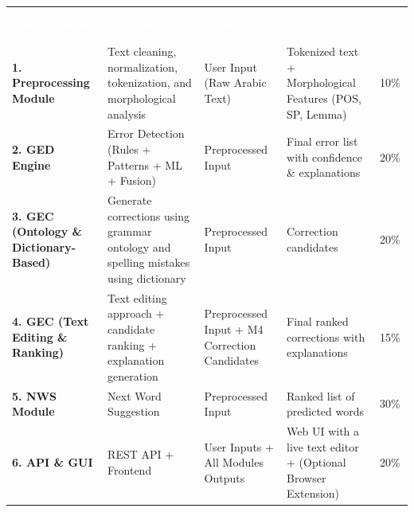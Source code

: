 \documentclass{article}
\begin{document}
\begin{table}[H]
\centering
\footnotesize 
\renewcommand{\arraystretch}{1.8} 
\setlength{\tabcolsep}{8pt}       


\begin{tabularx}{\textwidth}{
    >{\raggedright\arraybackslash}p{3cm} 
    >{\raggedright\arraybackslash}X 
    >{\raggedright\arraybackslash}p{3cm} 
    >{\raggedright\arraybackslash}p{3.1cm} 
    c
}

\rowcolor{accentred} 
\textcolor{white}{\textbf{Module Name}} & 
\textcolor{white}{\textbf{Function}} & 
\textcolor{white}{\textbf{Input}} & 
\textcolor{white}{\textbf{Expected Output}} & 
\textcolor{white}{\textbf{\% Libs}} \\ 

\textbf{\textcolor{accentgold}{1. Preprocessing Module}} & 
Text cleaning, normalization, tokenization, and morphological analysis & 
User Input (Raw Arabic Text) & 
Tokenized text + Morphological Features (POS, SP, Lemma) & 
10\% \\ 
 

\textbf{\textcolor{accentgold}{2. GED Engine}} & 
Error Detection (Rules + Patterns + ML + Fusion) & 
Preprocessed Input & 
Final error list with confidence \& explanations & 
20\% \\ 

\textbf{\textcolor{accentgold}{3. GEC (Ontology \& Dictionary-Based)}} & 
Generate corrections using grammar ontology and spelling mistakes using dictionary & 
Preprocessed Input & 
Correction candidates & 
20\% \\ 

\textbf{\textcolor{accentgold}{4. GEC (Text Editing \& Ranking)}} & 
Text editing approach + candidate ranking + explanation generation & 
Preprocessed Input + M4 Correction Candidates & 
Final ranked corrections with explanations & 
15\% \\ 


\textbf{\textcolor{accentgold}{5. NWS Module}} & 
Next Word Suggestion & 
Preprocessed Input & 
Ranked list of predicted words & 
30\% \\

\textbf{\textcolor{accentgold}{6. API \& GUI}} & 
REST API + Frontend & 
User Inputs + All Modules Outputs & 
Web UI with a live text editor + (Optional Browser Extension) & 
20\% \\ 

\end{tabularx}
\end{table}
\end{document}
